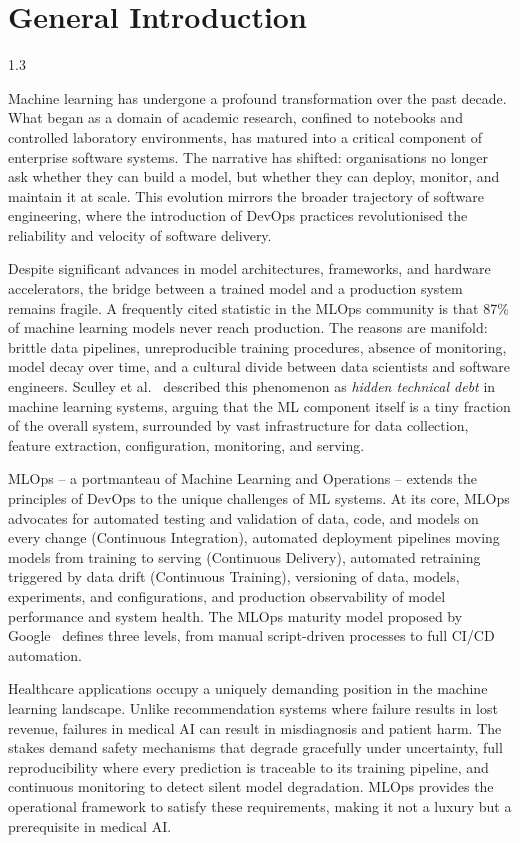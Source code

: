 \chapter{General Introduction}
\begin{spacing}{1.3}

Machine learning has undergone a profound transformation over the past decade. What began as a domain of academic research, confined to notebooks and controlled laboratory environments, has matured into a critical component of enterprise software systems. The narrative has shifted: organisations no longer ask whether they can build a model, but whether they can deploy, monitor, and maintain it at scale. This evolution mirrors the broader trajectory of software engineering, where the introduction of DevOps practices revolutionised the reliability and velocity of software delivery.

Despite significant advances in model architectures, frameworks, and hardware accelerators, the bridge between a trained model and a production system remains fragile. A frequently cited statistic in the MLOps community is that 87\% of machine learning models never reach production. The reasons are manifold: brittle data pipelines, unreproducible training procedures, absence of monitoring, model decay over time, and a cultural divide between data scientists and software engineers. Sculley et al.~\cite{sculley2015} described this phenomenon as \textit{hidden technical debt} in machine learning systems, arguing that the ML component itself is a tiny fraction of the overall system, surrounded by vast infrastructure for data collection, feature extraction, configuration, monitoring, and serving.

MLOps -- a portmanteau of Machine Learning and Operations -- extends the principles of DevOps to the unique challenges of ML systems. At its core, MLOps advocates for automated testing and validation of data, code, and models on every change (Continuous Integration), automated deployment pipelines moving models from training to serving (Continuous Delivery), automated retraining triggered by data drift (Continuous Training), versioning of data, models, experiments, and configurations, and production observability of model performance and system health. The MLOps maturity model proposed by Google~\cite{google_mlops} defines three levels, from manual script-driven processes to full CI/CD automation.

Healthcare applications occupy a uniquely demanding position in the machine learning landscape. Unlike recommendation systems where failure results in lost revenue, failures in medical AI can result in misdiagnosis and patient harm. The stakes demand safety mechanisms that degrade gracefully under uncertainty, full reproducibility where every prediction is traceable to its training pipeline, and continuous monitoring to detect silent model degradation. MLOps provides the operational framework to satisfy these requirements, making it not a luxury but a prerequisite in medical AI.


\end{spacing}
